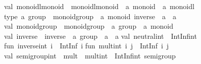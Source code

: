 \begin{isabellebody}
\begin{isamarkuptext}
val\ monoidl{}monoid\ {}\ {}monoidl{}monoid\ {}\ {}a\ monoid\ {}{}\ {}a\ monoidl{}\isanewline
\isanewline
type\ {}a\ group\ {}\ {}monoid{}group\ {}\ {}a\ monoid{}\ inverse\ {}\ {}a\ {}{}\ {}a{}{}\isanewline
val\ monoid{}group\ {}\ {}monoid{}group\ {}\ {}a\ group\ {}{}\ {}a\ monoid{}\isanewline
val\ inverse\ {}\ {}inverse\ {}\ {}a\ group\ {}{}\ {}a\ {}{}\ {}a{}\isanewline
\isanewline
val\ neutral{}int\ {}\ IntInf{}int\ {}\ {}{}\isanewline
\isanewline
fun\ inverse{}int\ i\ {}\ IntInf{}{}\ i{}\isanewline
\isanewline
fun\ mult{}int\ i\ j\ {}\ IntInf{}{}\ {}i{}\ j{}{}\isanewline
\isanewline
val\ semigroup{}int\ {}\ {}mult\ {}\ mult{}int{}\ {}\ IntInf{}int\ semigroup{}\isanewline

\end{isamarkuptext}
\end{isabellebody}
